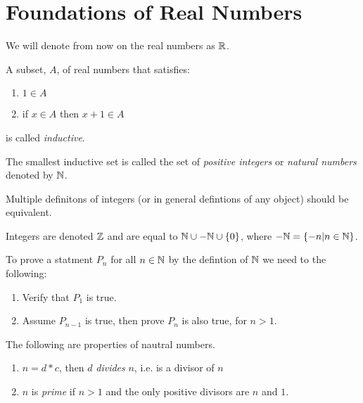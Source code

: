 

\section{Foundations of Real Numbers}

We will denote from now on the real numbers as \( \mathbb{R} \).

\begin{definition}
	A subset, \( A \), of real numbers that satisfies: 
	\begin{enumerate}
		\item \( 1 \in A \)
		\item if \( x \in A \) then \( x + 1 \in A \)
	\end{enumerate}
	is called {\em inductive}.
	\label{inductiveset}
\end{definition}

\begin{definition}
	The smallest inductive set is called the set of {\em positive integers} or {\em natural
	numbers} denoted by \( \mathbb{N} \).
	\label{naturalnumbers} 
\end{definition}

\begin{note}
	Multiple definitons of integers (or in general defintions of any object) should be
	equivalent.
\end{note}

\begin{definition}
	Integers are denoted \( \mathbb{Z} \) and are equal to \( \mathbb{N} \cup -\mathbb{N} \cup \left\{ 0 \right\} \),
	where \( - \mathbb{N} = \left\{ -n | n \in \mathbb{N} \right\} \). 
	\label{Integers}
\end{definition}

\begin{principle}[Induction]
	To prove a statment \( P_n \) for all \( n \in \mathbb{N} \) by the defintion of \( \mathbb{N} \) we need to
	the following:
	\begin{enumerate}
		\item Verify that \( P_1 \) is true.
		\item Assume \( P_{n-1} \) is true, then prove \( P_n \) is also true, for \( n > 1 \).
	\end{enumerate}
	\label{induction}
\end{principle}

\begin{definition}[Properties]
	The following are properties of nautral numbers.
	\begin{enumerate}
		\item \( n = d*c \), then \( d \) {\em divides} \( n \), i.e. is a divisor of \( n \)
		\item \( n \) is {\em prime} if \( n > 1 \) and the only positive divisors are \( n
			\) and \( 1 \). 
	\end{enumerate}
	\label{naturalproperties}
\end{definition}

